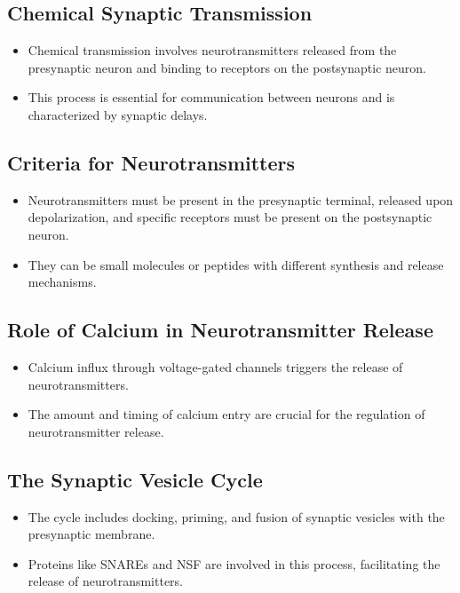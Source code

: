 \documentclass{article}
\begin{document}
\subsection{Chemical Synaptic Transmission}
\begin{itemize}
    \item Chemical transmission involves neurotransmitters released from the presynaptic neuron and binding to receptors on the postsynaptic neuron.
    \item This process is essential for communication between neurons and is characterized by synaptic delays.
\end{itemize}

\subsection{Criteria for Neurotransmitters}
\begin{itemize}
    \item Neurotransmitters must be present in the presynaptic terminal, released upon depolarization, and specific receptors must be present on the postsynaptic neuron.
    \item They can be small molecules or peptides with different synthesis and release mechanisms.
\end{itemize}

\subsection{Role of Calcium in Neurotransmitter Release}
\begin{itemize}
    \item Calcium influx through voltage-gated channels triggers the release of neurotransmitters.
    \item The amount and timing of calcium entry are crucial for the regulation of neurotransmitter release.
\end{itemize}

\subsection{The Synaptic Vesicle Cycle}
\begin{itemize}
    \item The cycle includes docking, priming, and fusion of synaptic vesicles with the presynaptic membrane.
    \item Proteins like SNAREs and NSF are involved in this process, facilitating the release of neurotransmitters.
\end{itemize}
\end{document}
